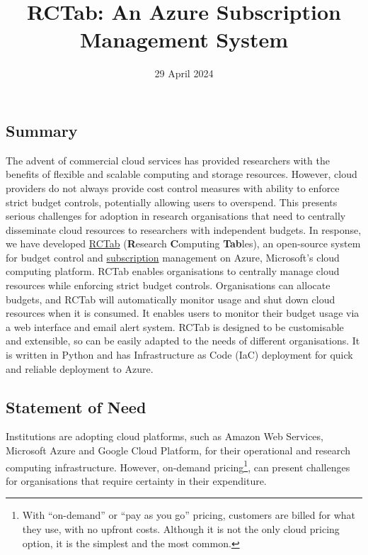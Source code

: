 \documentclass[
]{article}
\title{RCTab: An Azure Subscription Management System}
\author{}
\date{29 April 2024}
\begin{document}
\maketitle

\subsection{Summary}\label{summary}

The advent of commercial cloud services has provided researchers with
the benefits of flexible and scalable computing and storage resources.
However, cloud providers do not always provide cost control measures
with ability to enforce strict budget controls, potentially allowing
users to overspend. This presents serious challenges for adoption in
research organisations that need to centrally disseminate cloud
resources to researchers with independent budgets. In response, we have
developed \href{https://rctab.readthedocs.io/}{RCTab} (\textbf{R}esearch
\textbf{C}omputing \textbf{Tab}les), an open-source system for budget
control and
\href{https://learn.microsoft.com/en-us/azure/cloud-adoption-framework/ready/azure-setup-guide/organize-resources\#management-levels-and-hierarchy}{subscription}
management on Azure, Microsoft's cloud computing platform. RCTab enables
organisations to centrally manage cloud resources while enforcing strict
budget controls. Organisations can allocate budgets, and RCTab will
automatically monitor usage and shut down cloud resources when it is
consumed. It enables users to monitor their budget usage via a web
interface and email alert system. RCTab is designed to be customisable
and extensible, so can be easily adapted to the needs of different
organisations. It is written in Python and has Infrastructure as Code
(IaC) deployment for quick and reliable deployment to Azure.

\subsection{Statement of Need}\label{statement-of-need}

Institutions are adopting cloud platforms, such as Amazon Web Services,
Microsoft Azure and Google Cloud Platform, for their operational and
research computing infrastructure. However, on-demand
pricing\footnote{With ``on-demand'' or ``pay as you go'' pricing,
  customers are billed for what they use, with no upfront costs.
  Although it is not the only cloud pricing option, it is the simplest
  and the most common.}, can present challenges for organisations that
require certainty in their expenditure.
\end{document}
